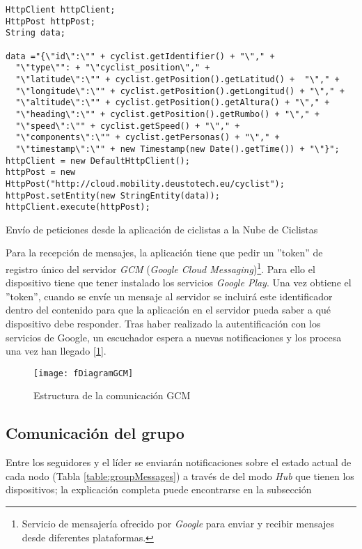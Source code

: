 \begin{listing}
	\begin{minipage}{.4\textwidth}
		\begin{verbatim}
HttpClient httpClient;
HttpPost httpPost;
String data;
							
data ="{\"id\":\"" + cyclist.getIdentifier() + "\"," +
  "\"type\"": + "\"cyclist_position\"," +
  "\"latitude\":\"" + cyclist.getPosition().getLatitud() +  "\"," +
  "\"longitude\":\"" + cyclist.getPosition().getLongitud() + "\"," +
  "\"altitude\":\"" + cyclist.getPosition().getAltura() + "\"," +
  "\"heading\":\"" + cyclist.getPosition().getRumbo() + "\"," +
  "\"speed\":\"" + cyclist.getSpeed() + "\"," +
  "\"components\":\"" + cyclist.getPersonas() + "\"," +
  "\"timestamp\":\"" + new Timestamp(new Date().getTime()) + "\"}";
httpClient = new DefaultHttpClient();
httpPost = new HttpPost("http://cloud.mobility.deustotech.eu/cyclist");
httpPost.setEntity(new StringEntity(data));
httpClient.execute(httpPost);
		\end{verbatim}
	\end{minipage}
	\caption{Envío de peticiones desde la aplicación de ciclistas a la Nube de Ciclistas}\label{alg:CyclistSend}
\end{listing}

Para la recepción de mensajes, la aplicación tiene que pedir un ''token'' de registro único del servidor \emph{GCM} (\emph{Google Cloud Messaging})\footnote{Servicio de mensajería ofrecido por \emph{Google} para enviar y recibir mensajes desde diferentes plataformas.}. Para ello el dispositivo tiene que tener instalado los servicios \emph{Google Play}. Una vez obtiene el ''token'', cuando se envíe un mensaje al servidor se incluirá este identificador dentro del contenido para que la aplicación en el servidor pueda saber a qué dispositivo debe responder. Tras haber realizado la autentificación con los servicios de Google, un escuchador espera a nuevas notificaciones y los procesa una vez han llegado [\ref{figure:DiagramGCM}].
\begin{figure}[h]
	\texttt{[image: fDiagramGCM]}
	\caption{Estructura de la comunicación GCM}
	\label{figure:DiagramGCM}
\end{figure}

\subsection{Comunicación del grupo}\label{ssection:comunicacion_grupo}
Entre los seguidores y el líder se enviarán notificaciones sobre el estado actual de cada nodo (Tabla \ref{table:groupMessages}) a través de del modo \emph{Hub} que tienen los dispositivos; la explicación completa puede encontrarse en la subsección %

